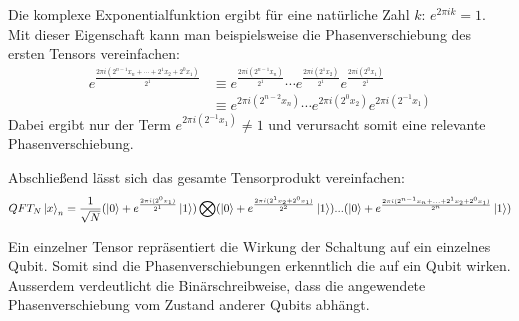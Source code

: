 Die komplexe Exponentialfunktion ergibt für eine natürliche Zahl \(k\): \(e^{2\pi i k} = 1\).
Mit dieser Eigenschaft kann man beispielsweise die Phasenverschiebung des ersten Tensors vereinfachen:
\begin{align*} 
  e^{\frac{2 \pi i (2^{n-1}x_n+ \dotsb +2^1x_2+2^0x_1)}{2^1}}
  &\equiv
  e^{\frac{2 \pi i (2^{n-1}x_n)}{2^1}} \dotsb e^{\frac{2 \pi i (2^1x_2)}{2^1}} e^{\frac{2 \pi i (2^0x_1)}{2^1}} \\
  &\equiv 
  e^{{2 \pi i (2^{n-2}x_n)}} \dotsb e^{{2 \pi i (2^0x_2)}} e^{{2 \pi i (2^{-1}x_1)}}
\end{align*}
Dabei ergibt nur der Term \(e^{{2 \pi i (2^{-1}x_1)}} \neq 1 \)  
und verursacht somit eine relevante Phasenverschiebung.

Abschließend lässt sich das gesamte Tensorprodukt vereinfachen:
\[QFT_{N}\ket{x}_{n} = \frac{1}{\sqrt{N}}(\ket{0} + { e^{\frac{2 \pi i (2^0x_1)}{2^1}}}\ket{1}) \bigotimes
( \ket{0} + { e^{\frac{2 \pi i (2^1x_2+2^0x_1)}{2^2}}}\ket{1})...
( \ket{0} + { e^{\frac{2 \pi i (2^{n-1}x_n+ ... +2^1x_2+2^0x_1)}{2^n}}}\ket{1})\]

Ein einzelner Tensor repräsentiert die Wirkung der Schaltung auf ein einzelnes Qubit.
Somit sind die Phasenverschiebungen erkenntlich die auf ein Qubit wirken.
Ausserdem verdeutlicht die Binärschreibweise, dass die angewendete Phasenverschiebung vom Zustand anderer Qubits abhängt.

